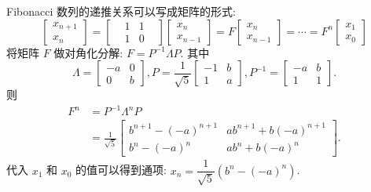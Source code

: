 Fibonacci 数列的递推关系可以写成矩阵的形式:
\[
\begin{bmatrix}
x_{n+1} \\
x_n 
\end{bmatrix} = 
\begin{bmatrix}
& 1 & 1 & \\
& 1 & 0 & 
\end{bmatrix}
\begin{bmatrix}
x_n \\
x_{n-1}
\end{bmatrix}
=F \begin{bmatrix}
x_n \\
x_{n-1}
\end{bmatrix}
=\cdots
=F^{n} \begin{bmatrix}
x_1 \\
x_0
\end{bmatrix}
\]
将矩阵 $ F $ 做对角化分解: $ F = P^{-1} \Lambda P $. 其中 
\[ \Lambda = \begin{bmatrix} -a & 0 \\ 0 & b \end{bmatrix} , P = \frac{1}{\sqrt{5}}\begin{bmatrix} -1 & b \\ 1 & a \end{bmatrix}, P^{-1} = \begin{bmatrix} -a & b \\ 1 & 1 \end{bmatrix} .\]
则 
\begin{align*}
F^{n} &= P^{-1}\Lambda^{n} P \\
 &= \frac{1}{\sqrt{5}}\begin{bmatrix}
b^{n+1} - (-a)^{n+1} & ab^{n+1}+b(-a)^{n+1} \\b^n - (-a)^n & ab^n+b(-a)^n 
\end{bmatrix} 
.\end{align*}
代入 $x_1$ 和 $ x_0$ 的值可以得到通项: $x_n = \dfrac{1}{\sqrt{5}}\left(b^n - (-a)^n\right)$.

